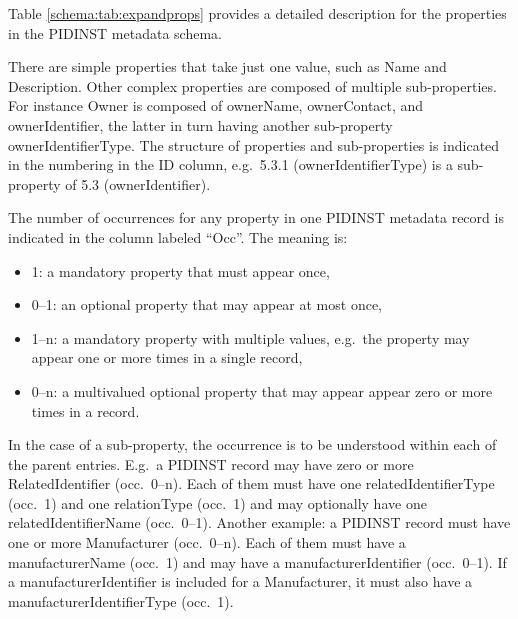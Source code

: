 \documentclass[titlepage=true,twoside=false,DIV=13]{scrartcl}
\begin{document}
Table \ref{schema:tab:expandprops} provides a detailed description for
the properties in the PIDINST metadata schema.

There are simple properties that take just one value, such as Name and
Description.  Other complex properties are composed of multiple
sub-properties.  For instance Owner is composed of ownerName,
ownerContact, and ownerIdentifier, the latter in turn having another
sub-property ownerIdentifierType.  The structure of properties and
sub-properties is indicated in the numbering in the ID column,
e.g.\ 5.3.1 (ownerIdentifierType) is a sub-property of 5.3
(ownerIdentifier).

The number of occurrences for any property in one PIDINST metadata
record is indicated in the column labeled ``Occ''.  The meaning is:
\begin{itemize}
\item 1: a mandatory property that must appear once,
\item 0--1: an optional property that may appear at most once,
\item 1--n: a mandatory property with multiple values, e.g.\ the
  property may appear one or more times in a single record,
\item 0--n: a multivalued optional property that may appear appear zero
  or more times in a record.
\end{itemize}
In the case of a sub-property, the occurrence is to be understood
within each of the parent entries.  E.g.\ a PIDINST record may have
zero or more RelatedIdentifier (occ.\ 0--n).  Each of them must have
one relatedIdentifierType (occ.\ 1) and one relationType (occ.\ 1) and
may optionally have one relatedIdentifierName (occ.\ 0--1).  Another
example: a PIDINST record must have one or more Manufacturer
(occ.\ 0--n).  Each of them must have a manufacturerName (occ.\ 1) and
may have a manufacturerIdentifier (occ.\ 0--1).  If a
manufacturerIdentifier is included for a Manufacturer, it must also
have a manufacturerIdentifierType (occ.\ 1).

\newlength{\idcolw}\settowidth{\idcolw}{5.3.1}
\newlength{\propcolw}\settowidth{\propcolw}{instrumentTypeIdentifierType}
\newlength{\occcolw}
\newlength{\valcolw}\settowidth{\valcolw}{Controlled list of values:}
\setlength{\defcolw}{\textwidth}
\addtolength{\defcolw}{-\idcolw}
\addtolength{\defcolw}{-\propcolw}
\addtolength{\defcolw}{-\occcolw}
\addtolength{\defcolw}{-\valcolw}
\addtolength{\defcolw}{-10\tabcolsep}
\end{document}
